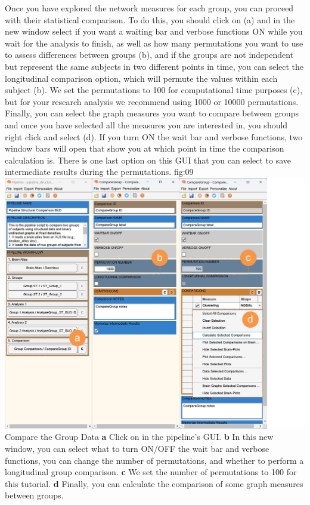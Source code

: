\documentclass[justified]{tufte-handout}
\begin{document}
Once you have explored the network measures for each group, you can proceed with their statistical comparison. To do this, you should click on  (a) and in the new window select if you want a waiting bar and verbose functions ON while you wait for the analysis to finish, as well as how many permutations you want to use to assess differences between groups ({b}), and if the groups are not independent but represent the same subjects in two different points in time, you can select the longitudinal comparison option, which will permute the values within each subject ({b}). We set the permutations to 100 for computational time purposes ({c}), but for your research analysis we recommend using 1000 or 10000 permutations. Finally, you can select the graph measures you want to compare between groups and once you have selected all the measures you are interested in, you should right click and select  ({d}). If you turn ON the wait bar and verbose functions, two window bars will open that show you at which point in time the comparison calculation is. There is one last option on this GUI that you can select to save intermediate results during the permutations.
	{fig:09}
	{
	\includegraphics{fig09.jpg}
	}
	{Compare the Group Data}
	{
	{\bf a} Click on  in the pipeline's GUI.
	{\bf b} In this new window, you can select what to turn ON/OFF the wait bar and verbose functions, you can change the number of permutations, and whether to perform a longitudinal group comparison. {\bf c} We set the number of permutations to 100 for this tutorial. {\bf d} Finally, you can calculate the comparison of some graph measures between groups.
	}
 
\end{document}
